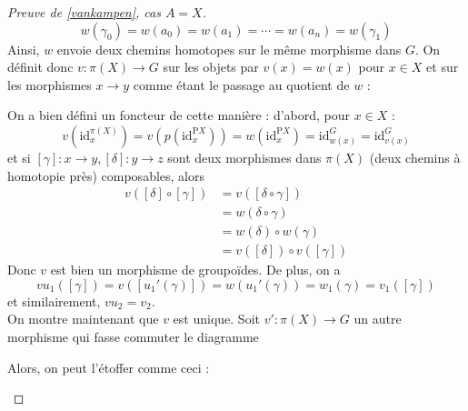\documentclass{article}
\renewcommand{\P}{\mathrm{P}}
\DeclareMathOperator{\Hom}{Hom}
\newcommand{\id}{\mathrm{id}}
\theoremstyle{definition}
\theoremstyle{remark}
\begin{document}
\begin{proof}[Preuve de \ref{vankampen}, cas $A=X$]
    \[w(\gamma_0) = w(a_0) = w(a_1) = \cdots = w(a_n) = w(\gamma_1)\]
    Ainsi, $w$ envoie deux chemins homotopes sur le même morphisme dans $G$. On définit donc $v : \pi(X) \to G$ sur les objets par $v(x) = w(x)$ pour $x \in X$ et sur les morphismes $x \to y$ comme étant le passage au quotient de $w$ :
    \begin{center}
    \end{center}
    On a bien défini un foncteur de cette manière : d'abord, pour $x \in X$ :
    \[v(\id_x^{\pi(X)}) = v(p(\id_x^{\P X})) = w(\id_x^{\P X}) = \id_{w(x)}^G = \id_{v(x)}^G\]
    et si $[\gamma] : x \to y,[\delta] : y \to z$ sont deux morphismes dans $\pi(X)$ (deux chemins à homotopie près) composables, alors
    \begin{align*}
        v([\delta] \circ [\gamma]) & = v([\delta \circ \gamma]) \\
        & = w(\delta \circ \gamma) \\
        & = w(\delta) \circ w(\gamma) \\
        & = v([\delta]) \circ v([\gamma])
    \end{align*}
    Donc $v$ est bien un morphisme de groupoïdes. De plus, on a
    \[vu_1([\gamma]) = v([u_1'(\gamma)]) = w(u_1'(\gamma)) = w_1(\gamma) = v_1([\gamma])\]
    et similairement, $v u_2 = v_2$. \\
    On montre maintenant que $v$ est unique. Soit $v' : \pi(X) \to G$ un autre morphisme qui fasse commuter le diagramme
    \begin{center}
    \end{center}
    Alors, on peut l'étoffer comme ceci :
    \begin{center}
\end{center}
\end{proof}
\end{document}
